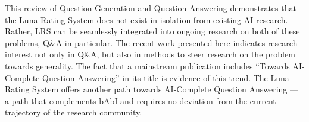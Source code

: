 This review of Question Generation and Question Answering demonstrates that the Luna Rating System does not exist in isolation from existing AI research. Rather, LRS can be seamlessly integrated into ongoing research on both of these problems, Q\&A in particular. The recent work presented here indicates research interest not only in Q\&A, but also in methods to steer research on the problem towards generality. The fact that a mainstream publication includes ``Towards AI-Complete Question Answering'' in its title is evidence of this trend. The Luna Rating System offers another path towards AI-Complete Question Answering --- a path that complements bAbI and requires no deviation from the current trajectory of the research community.

%
%
%
